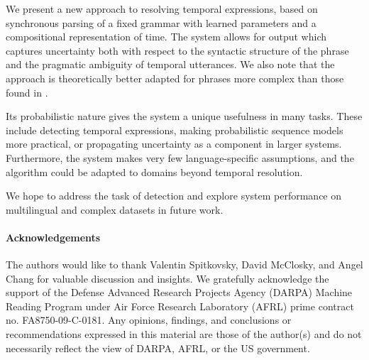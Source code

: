 We present a new approach to resolving temporal expressions,
	based on synchronous parsing of a fixed grammar with learned parameters
	and a compositional representation of time.
The system allows for output which captures uncertainty both with respect to 
	the syntactic structure of the phrase and the pragmatic ambiguity of 
	temporal utterances.
We also note that the approach is theoretically better adapted for
	phrases more complex than those found in \tempeval.

Its probabilistic nature gives the system a unique usefulness
	in many tasks.
These include detecting temporal expressions, making probabilistic
	sequence models more practical, or propagating uncertainty as a
	component in larger systems.
Furthermore, the system makes very few language-specific assumptions,
	and the algorithm could be adapted to domains beyond temporal resolution.

We hope to address the task of detection and explore system performance
	on multilingual and complex datasets in future work.

{\footnotesize
\paragraph{\footnotesize Acknowledgements}
The authors would like to thank Valentin Spitkovsky, David McClosky,
	and Angel Chang for valuable discussion and insights.
We gratefully acknowledge the support of the Defense Advanced 
	Research Projects Agency (DARPA) Machine Reading Program under Air 
	Force Research Laboratory (AFRL) prime contract no. FA8750-09-C-0181. 
Any opinions, findings, and conclusions or recommendations expressed 
	in this material are those of the author(s) and do not necessarily 
	reflect the view of DARPA, AFRL, or the US government.
}
